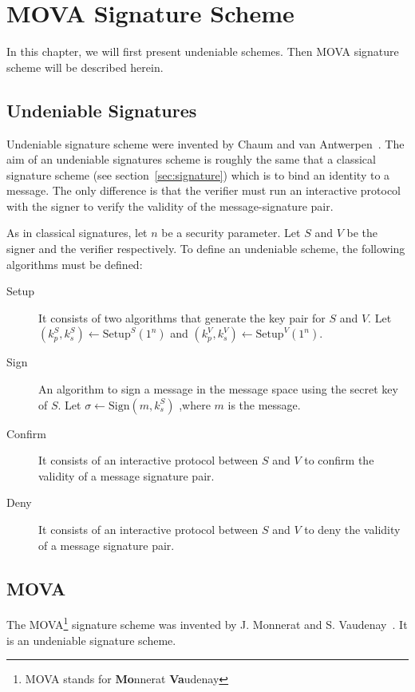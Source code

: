 \chapter{MOVA Signature Scheme}
\label{chap:mova}

In this chapter, we will first present undeniable schemes. 
Then MOVA signature scheme will be described herein.

\section{Undeniable Signatures}
Undeniable signature scheme were invented by Chaum and van Antwerpen~\cite{cite:chaum}.
The aim of an undeniable signatures scheme is roughly the same that a classical 
signature scheme (see section~\ref{sec:signature}) which is to bind an identity to a message.
The only difference is that the verifier must run an interactive protocol with the signer
to verify the validity of the message-signature pair.

As in classical signatures, let $n$ be a security parameter. Let $S$ and $V$ be
the signer and the verifier respectively. To define an undeniable scheme, the following algorithms must be 
defined:
\begin{description}
    \item[Setup] It consists of two algorithms that generate the key pair for $S$ and $V$.
        Let $(k_p^S,k_s^S) \leftarrow \mathrm{Setup}^S(1^n)$ and 
        $(k_p^V,k_s^V) \leftarrow \mathrm{Setup}^V(1^n)$.
    \item[Sign] An algorithm to sign a message in the message space using the secret key 
        of $S$.
        Let $\sigma \leftarrow \mathrm{Sign}(m,k_s^S)$ ,where $m$ is the message.
    \item[Confirm] It consists of an interactive protocol between $S$ and $V$ to confirm 
        the validity of a message signature pair.
    \item[Deny] It consists of an interactive protocol between $S$ and $V$ to deny the 
        validity of a message signature pair.
\end{description}


\section{MOVA}
The MOVA\footnote{MOVA stands for {\bf Mo}nnerat {\bf Va}udenay} signature scheme 
was invented by J. Monnerat and S. Vaudenay~\cite{cite:thesis-monnerat,cite:2-move,
cite:mova-crypto-journal,cite:opti-mova,cite:generic-mova}. It is an undeniable signature scheme. 

